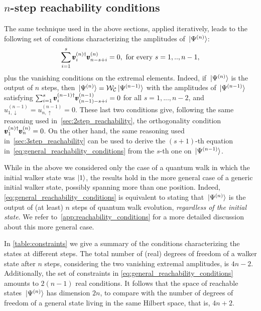 \subsection{\texorpdfstring{$n$-step}{n-step} reachability conditions}
The same technique used in the above sections, applied iteratively, leads to the following set of conditions characterizing the amplitudes of $\ket*{\Psi^{(n)}}$:
\begin{equation}
	\sum_{i=1}^s \pmb{v}_i^{(n)\dagger} \pmb{v}^{(n)}_{n-s+i} = 0,
	\text{ for every } s=1,..,n-1,
	\label{eq:general_reachability_conditions}
\end{equation}
plus the vanishing conditions on the extremal elements.
Indeed, if $\ket*{\Psi^{(n)}}$ is the output of $n$ steps, then $\ket*{\Psi^{(n)}} = \mathcal W_{\mathcal C}\ket*{\Psi^{(n-1)}}$ with the amplitudes of $\ket*{\Psi^{(n-1)}}$ satisfying
$\sum_{i=1}^s \pmb{v}_i^{(n-1)\dagger} \pmb{v}_{(n-1)-s+i}^{(n-1)} = 0$
for all $s=1,...,n-2$,
and $u_{1,\downarrow}^{(n-1)} = u_{n, \uparrow}^{(n-1)} = 0$.
These last two conditions give, following the same reasoning used in~\cref{sec:2step_reachability}, the orthogonality condition $\pmb{v}_1^{(n)\dagger} \pmb{v}_n^{(n)} = 0$.
On the other hand, the same reasoning used in~\cref{sec:3step_reachability} can be used to derive the $(s+1)$-th equation in~\cref{eq:general_reachability_conditions} from the $s$-th one on $\ket*{\Psi^{(n-1)}}$.

While in the above we considered only the case of a quantum walk in which the initial walker state was $\ket1$, 
the results hold in the more general case of a generic initial walker state, possibly spanning more than one position.
Indeed, \cref{eq:general_reachability_conditions} is equivalent to stating that $\ket*{\Psi^{(n)}}$ is the output of (at least) $n$ steps of quantum walk evolution, \textit{regardless of the initial state}.
We refer to~\cref{app:reachability_conditions} for a more detailed discussion about this more general case.

In \mbox{\cref{table:constraints}} we give a summary of the conditions characterizing the states at different steps.
The total number of (real) degrees of freedom of a walker state after $n$ steps, considering the two vanishing extremal amplitudes, is $4n - 2$.
Additionally, the set of constraints in \cref{eq:general_reachability_conditions} amounts to $2(n-1)$ real conditions.
It follows that the space of reachable states $\ket*{\Psi^{(n)}}$ has dimension $2n$, to compare with the number of degrees of freedom of a general state living in the same Hilbert space, that is, $4n + 2$.

